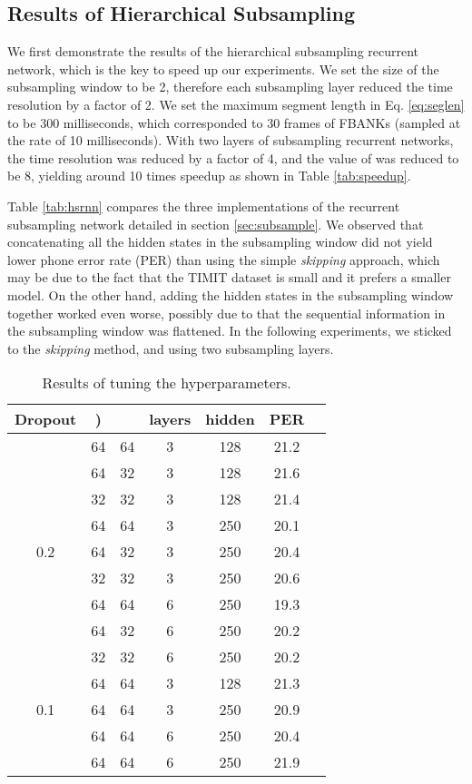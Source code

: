 \documentclass[a4paper]{article}
\begin{document}
\subsection{Results of Hierarchical Subsampling}

We first demonstrate the results of the hierarchical subsampling recurrent network, which is the key to speed up our experiments. We set the size of the subsampling window to be 2, therefore each subsampling layer reduced the time resolution by a factor of 2. We set the maximum segment length  in Eq. \eqref{eq:seglen} to be 300 milliseconds, which corresponded to 30 frames of FBANKs (sampled at the rate of 10 milliseconds).  With two layers of subsampling recurrent networks, the time resolution was reduced by a factor of 4, and the value of  was reduced to be 8, yielding around 10 times speedup as shown in Table \ref{tab:speedup}. 

Table \ref{tab:hsrnn} compares the three implementations of the recurrent subsampling network detailed in section \ref{sec:subsample}. We observed that concatenating all the hidden states in the subsampling window did not yield lower phone error rate (PER) than using the simple {\it skipping} approach, which may be due to the fact that the TIMIT dataset is small and it prefers a smaller model. On the other hand, adding the hidden states in the subsampling window together worked even worse, possibly due to that the sequential information in the subsampling window was flattened. In the following experiments, we sticked to the {\it skipping} method, and using two subsampling layers.

 \begin{table}
 \centering \small
\caption{Results of tuning the hyperparameters. }\vskip 1.5mm
\label{tab:tune}
\begin{tabular}{c|cccccc}
\hline

\hline
Dropout  & ) &  & layers & hidden & PER  \\ \hline
 & 64 & 64 & 3 & 128  & 21.2 \\
& 64 & 32 & 3 & 128 & 21.6 \\
 & 32 & 32 & 3 & 128  & 21.4 \\ \cline{2-6}
  & 64 & 64 & 3 & 250 & 20.1 \\
 0.2 & 64 & 32 & 3 & 250 & 20.4 \\
 & 32 & 32 & 3 & 250 & 20.6 \\ \cline{2-6}
 & 64 & 64 & 6 & 250 & 19.3 \\
 & 64 & 32 & 6 & 250 & 20.2  \\
 & 32 & 32 & 6 & 250 & 20.2 \\ \hline
 & 64 & 64 & 3 & 128 & 21.3 \\
0.1 & 64 & 64 & 3 & 250 & 20.9 \\
 & 64 & 64 & 6 & 250 & 20.4 \\ \hline
  & 64 & 64 & 6 & 250 & 21.9 \\
\hline

\hline
\end{tabular}
\vskip-4mm
\end{table}
\end{document}
